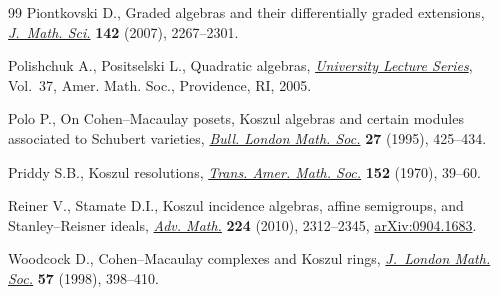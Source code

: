 \documentclass[pdftex]{sigma}
\renewcommand{\^}[1]{\mbox{$^{\left( #1 \right)}$}}
\renewcommand{\_}[1]{\mbox{$_{\left( #1 \right)}$}}
\numberwithin{equation}{section}
\begin{document}
\begin{thebibliography}{99}
Piontkovski D., Graded algebras and their dif\/ferentially graded extensions,
 \href{http://dx.doi.org/10.1007/s10958-007-0137-y}{\textit{J.~Math. Sci.}} \textbf{142} (2007), 2267--2301.

Polishchuk A., Positselski L., Quadratic algebras, \href{http://dx.doi.org/10.1090/ulect/037}{\textit{University Lecture
 Series}}, Vol.~37, Amer. Math. Soc., Providence, RI, 2005.

Polo P., On {C}ohen--{M}acaulay posets, {K}oszul algebras and certain modules
 associated to {S}chubert varieties, \href{http://dx.doi.org/10.1112/blms/27.5.425}{\textit{Bull. London Math. Soc.}}
 \textbf{27} (1995), 425--434.

Priddy S.B., Koszul resolutions, \href{http://dx.doi.org/10.1090/S0002-9947-1970-0265437-8}{\textit{Trans. Amer. Math. Soc.}} \textbf{152}
 (1970), 39--60.

Reiner V., Stamate D.I., Koszul incidence algebras, af\/f\/ine semigroups, and
 {S}tanley--{R}eisner ideals, \href{http://dx.doi.org/10.1016/j.aim.2010.02.005}{\textit{Adv. Math.}} \textbf{224} (2010),
 2312--2345, \href{http://arxiv.org/abs/0904.1683}{arXiv:0904.1683}.

Woodcock D., Cohen--{M}acaulay complexes and {K}oszul rings, \href{http://dx.doi.org/10.1112/S0024610798005717}{\textit{J.~London
 Math. Soc.}} \textbf{57} (1998), 398--410.

\end{thebibliography}\LastPageEnding
\end{document}
